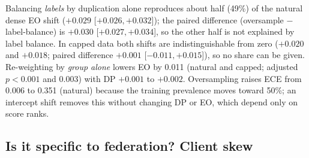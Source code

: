 \begin{table}[t]
\centering
\caption{Equal-$\lambda$ comparison, oversample vs.\ naive intersectional penalty, logistic regression, 20 seeds. $\Delta$EO is the paired difference [95\% CI].}
\label{tab:eqlam}
\footnotesize
\resizebox{\columnwidth}{!}{}
\end{table}

Balancing \emph{labels} by duplication alone reproduces about half (49\%) of the natural dense EO shift ($+0.029$ [$+0.026,+0.032$]); the paired difference (oversample $-$ label-balance) is $+0.030$ [$+0.027,+0.034$], so the other half is not explained by label balance. In capped data both shifts are indistinguishable from zero ($+0.020$ and $+0.018$; paired difference $+0.001$ [$-0.011,+0.015$]), so no share can be given. Re-weighting by \emph{group alone} lowers EO by 0.011 (natural and capped; adjusted $p<0.001$ and 0.003) with DP $+0.001$ to $+0.002$. Oversampling raises ECE from 0.006 to 0.351 (natural) because the training prevalence moves toward 50\%; an intercept shift removes this without changing DP or EO, which depend only on score ranks.

\subsection{Is it specific to federation? Client skew}
\label{sec:fedspec}
\begin{table}[t]
\centering
\caption{Centralized matched control vs.\ federated: frontier offsets, logistic regression, rule~(q), mean [95\% CI over seeds]. ``Diff'' = federated $-$ central (paired); 20 seeds per scenario; both scenarios use the dense frontier $\lambda\in\{0.5,1,2,4,8,16\}$.}
\label{tab:cvf}
\small
{}
\end{table}
\begin{table}[t]
\centering
\caption{Dirichlet-skewed client partitions of the same training data (10 seeds): offsets vs.\ the naive penalty on the core-grid chord (which overstates natural EO offsets, Sec.~III-C and Fig.~\ref{fig:dense}), rule~(q), mean [95\% CI]. Federated, centralized, and their paired difference. Exploratory.}
\label{tab:dir}
\scriptsize
{}
\end{table}

